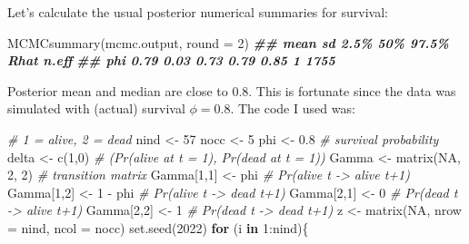\documentclass[
  12pt,
]{krantz}
\newenvironment{Shaded}{\begin{snugshade}}{\end{snugshade}}
\newcommand{\AttributeTok}[1]{\textcolor[rgb]{0.77,0.63,0.00}{#1}}
\newcommand{\CommentTok}[1]{\textcolor[rgb]{0.56,0.35,0.01}{\textit{#1}}}
\newcommand{\ConstantTok}[1]{\textcolor[rgb]{0.00,0.00,0.00}{#1}}
\newcommand{\ControlFlowTok}[1]{\textcolor[rgb]{0.13,0.29,0.53}{\textbf{#1}}}
\newcommand{\DecValTok}[1]{\textcolor[rgb]{0.00,0.00,0.81}{#1}}
\newcommand{\DocumentationTok}[1]{\textcolor[rgb]{0.56,0.35,0.01}{\textbf{\textit{#1}}}}
\newcommand{\FloatTok}[1]{\textcolor[rgb]{0.00,0.00,0.81}{#1}}
\newcommand{\FunctionTok}[1]{\textcolor[rgb]{0.00,0.00,0.00}{#1}}
\newcommand{\NormalTok}[1]{#1}
\newcommand{\OtherTok}[1]{\textcolor[rgb]{0.56,0.35,0.01}{#1}}
\newcommand{\SpecialCharTok}[1]{\textcolor[rgb]{0.00,0.00,0.00}{#1}}
\begin{document}
Let's calculate the usual posterior numerical summaries for survival:

\begin{Shaded}
\begin{Highlighting}[]
\FunctionTok{MCMCsummary}\NormalTok{(mcmc.output, }\AttributeTok{round =} \DecValTok{2}\NormalTok{)}
\DocumentationTok{\#\#     mean   sd 2.5\%  50\% 97.5\% Rhat n.eff}
\DocumentationTok{\#\# phi 0.79 0.03 0.73 0.79  0.85    1  1755}
\end{Highlighting}
\end{Shaded}

Posterior mean and median are close to \(0.8\). This is fortunate since the data was simulated with (actual) survival \(\phi = 0.8\). The code I used was:

\begin{Shaded}
\begin{Highlighting}[]
\CommentTok{\# 1 = alive, 2 = dead}
\NormalTok{nind }\OtherTok{\textless{}{-}} \DecValTok{57}
\NormalTok{nocc }\OtherTok{\textless{}{-}} \DecValTok{5}
\NormalTok{phi }\OtherTok{\textless{}{-}} \FloatTok{0.8} \CommentTok{\# survival probability}
\NormalTok{delta }\OtherTok{\textless{}{-}} \FunctionTok{c}\NormalTok{(}\DecValTok{1}\NormalTok{,}\DecValTok{0}\NormalTok{) }\CommentTok{\# (Pr(alive at t = 1), Pr(dead at t = 1))}
\NormalTok{Gamma }\OtherTok{\textless{}{-}} \FunctionTok{matrix}\NormalTok{(}\ConstantTok{NA}\NormalTok{, }\DecValTok{2}\NormalTok{, }\DecValTok{2}\NormalTok{) }\CommentTok{\# transition matrix}
\NormalTok{Gamma[}\DecValTok{1}\NormalTok{,}\DecValTok{1}\NormalTok{] }\OtherTok{\textless{}{-}}\NormalTok{ phi      }\CommentTok{\# Pr(alive t {-}\textgreater{} alive t+1)}
\NormalTok{Gamma[}\DecValTok{1}\NormalTok{,}\DecValTok{2}\NormalTok{] }\OtherTok{\textless{}{-}} \DecValTok{1} \SpecialCharTok{{-}}\NormalTok{ phi  }\CommentTok{\# Pr(alive t {-}\textgreater{} dead t+1)}
\NormalTok{Gamma[}\DecValTok{2}\NormalTok{,}\DecValTok{1}\NormalTok{] }\OtherTok{\textless{}{-}} \DecValTok{0}        \CommentTok{\# Pr(dead t {-}\textgreater{} alive t+1)}
\NormalTok{Gamma[}\DecValTok{2}\NormalTok{,}\DecValTok{2}\NormalTok{] }\OtherTok{\textless{}{-}} \DecValTok{1}        \CommentTok{\# Pr(dead t {-}\textgreater{} dead t+1)}
\NormalTok{z }\OtherTok{\textless{}{-}} \FunctionTok{matrix}\NormalTok{(}\ConstantTok{NA}\NormalTok{, }\AttributeTok{nrow =}\NormalTok{ nind, }\AttributeTok{ncol =}\NormalTok{ nocc)}
\FunctionTok{set.seed}\NormalTok{(}\DecValTok{2022}\NormalTok{)}
\ControlFlowTok{for}\NormalTok{ (i }\ControlFlowTok{in} \DecValTok{1}\SpecialCharTok{:}\NormalTok{nind)\{}

\end{Highlighting}
\end{Shaded}
\end{document}
